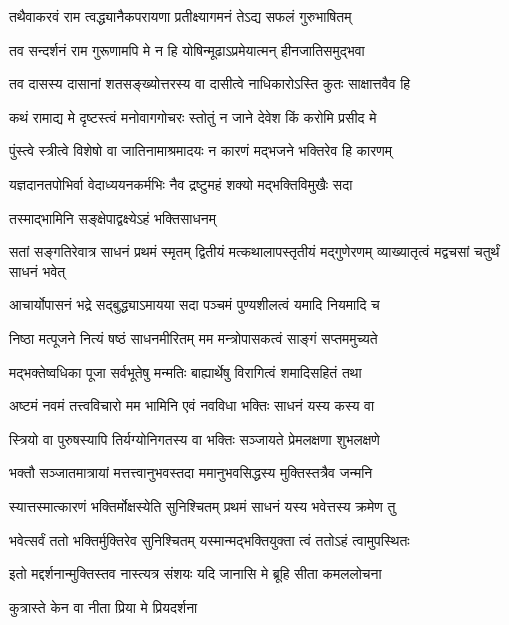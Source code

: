 \twolineshloka
{तथैवाकरवं राम त्वद्ध्यानैकपरायणा}
{प्रतीक्ष्यागमनं तेऽद्य सफलं गुरुभाषितम्} %

\twolineshloka
{तव सन्दर्शनं राम गुरूणामपि मे न हि}
{योषिन्मूढाऽप्रमेयात्मन् हीनजातिसमुद्भवा} %

\twolineshloka
{तव दासस्य दासानां शतसङ्ख्योत्तरस्य वा}
{दासीत्वे नाधिकारोऽस्ति कुतः साक्षात्तवैव हि} %

\twolineshloka
{कथं रामाद्य मे दृष्टस्त्वं मनोवागगोचरः}
{स्तोतुं न जाने देवेश किं करोमि प्रसीद मे} %


\twolineshloka
{पुंस्त्वे स्त्रीत्वे विशेषो वा जातिनामाश्रमादयः}
{न कारणं मद्भजने भक्तिरेव हि कारणम्} %

\twolineshloka
{यज्ञदानतपोभिर्वा वेदाध्ययनकर्मभिः}
{नैव द्रष्टुमहं शक्यो मद्भक्तिविमुखैः सदा} %

\onelineshloka
{तस्माद्भामिनि सङ्क्षेपाद्वक्ष्येऽहं भक्तिसाधनम्} %


\threelineshloka
{सतां सङ्गतिरेवात्र साधनं प्रथमं स्मृतम्}
{द्वितीयं मत्कथालापस्तृतीयं मद्गुणेरणम्}
{व्याख्यातृत्वं मद्वचसां चतुर्थं साधनं भवेत्} %

\twolineshloka
{आचार्योपासनं भद्रे सद्बुद्ध्याऽमायया सदा}
{पञ्चमं पुण्यशीलत्वं यमादि नियमादि च} %

\twolineshloka
{निष्ठा मत्पूजने नित्यं षष्ठं साधनमीरितम्}
{मम मन्त्रोपासकत्वं साङ्गं सप्तममुच्यते} %

\twolineshloka
{मद्भक्तेष्वधिका पूजा सर्वभूतेषु मन्मतिः}
{बाह्यार्थेषु विरागित्वं शमादिसहितं तथा} %

\twolineshloka
{अष्टमं नवमं तत्त्वविचारो मम भामिनि}
{एवं नवविधा भक्तिः साधनं यस्य कस्य वा} %

\twolineshloka
{स्त्रियो वा पुरुषस्यापि तिर्यग्योनिगतस्य वा}
{भक्तिः सञ्जायते प्रेमलक्षणा शुभलक्षणे} %

\twolineshloka
{भक्तौ सञ्जातमात्रायां मत्तत्त्वानुभवस्तदा}
{ममानुभवसिद्धस्य मुक्तिस्तत्रैव जन्मनि} %

\twolineshloka
{स्यात्तस्मात्कारणं भक्तिर्मोक्षस्येति सुनिश्चितम्}
{प्रथमं साधनं यस्य भवेत्तस्य क्रमेण तु} %

\twolineshloka
{भवेत्सर्वं ततो भक्तिर्मुक्तिरेव सुनिश्चितम्}
{यस्मान्मद्भक्तियुक्ता त्वं ततोऽहं त्वामुपस्थितः} %

\twolineshloka
{इतो मद्दर्शनान्मुक्तिस्तव नास्त्यत्र संशयः}
{यदि जानासि मे ब्रूहि सीता कमललोचना} %

\onelineshloka
{कुत्रास्ते केन वा नीता प्रिया मे प्रियदर्शना} %


